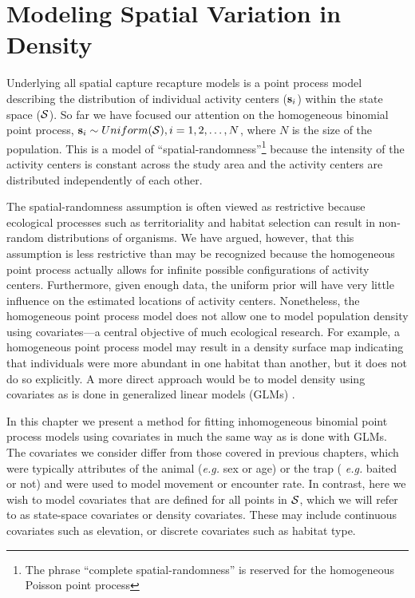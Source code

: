 


\chapter{%
Modeling Spatial Variation in Density
}
\label{chapt.state-space}

\vspace{0.3cm}

Underlying all spatial capture recapture models is a point process
model describing the distribution of individual activity
centers (${\bf s}_i$) within the state space ($\cal{S}$). So far we have focused our
attention on the homogeneous binomial point process,
${\bf s}_i \sim Uniform({\cal S}), i=1,2,\dots,N$, where $N$ is the
size of the population. This is a model of
``spatial-randomness''\footnote{The phrase ``complete
  spatial-randomness'' is reserved for the homogeneous Poisson point
  process}
because the intensity of the
activity centers is constant across the study area and the activity
centers are distributed independently of each other.

The spatial-randomness assumption is often viewed as restrictive
because ecological processes such as
territoriality and habitat selection can result in non-random
distributions of organisms. We have argued, however, that this
assumption is less restrictive than may be recognized because the
homogeneous point process actually allows for infinite
possible configurations of activity centers. Furthermore, given enough data,
the uniform prior will have very little influence on the estimated
locations of activity centers. Nonetheless, the homogeneous point
process model does not allow one to model population density using
covariates---a central objective of much ecological research.
For example, a homogeneous point process model
may result in a density surface map indicating that individuals were
more abundant in one habitat than another, but it does not do so
explicitly. A more direct approach would be to model density using
covariates as is done in generalized linear models (GLMs)
\citep{mccullagh_nelder:1989}. %

In this chapter we present a method
for fitting inhomogeneous binomial point process models using
covariates in much the same way as is done with GLMs. The
covariates we consider differ
from those covered in previous chapters, which were typically
attributes of the animal ({\it e.g.} sex or age) or the trap ({\it
  e.g.} baited or not) and were used to model movement or encounter
rate. In contrast, here we wish to
model covariates that are defined for all points in
$\cal{S}$, which we will refer to as
state-space covariates or density covariates. These may
include continuous covariates such as elevation, or discrete
covariates such as habitat type.

